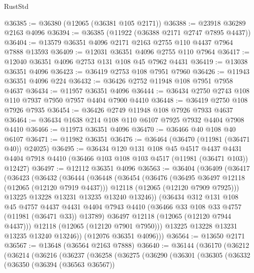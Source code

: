 \begin{lexlean}{RustStd}
\begin{coremodule}
@36385 := @36380 (@12065 (@36381 @105 @2171))
@36388 := @23918 @36289 @2163 @4096
@36394 := @36385 (@11922 (@36388 @2171 @2747 @7895 @4437))
@36404 := @13579 @36351 @4096 @2171 @2163 @2755 @110 @4437 @7964 @7888 @13593
@36409 := @12031 @36351 @4096 @2755 @110 @7964
@36417 := @12040 @36351 @4096 @2753 @131 @108 @45 @7962 @4431
@36419 := @13038 @36351 @4096
@36423 := @36419 @2753 @108 @7951 @7960
@36426 := @11943 @36351 @4096 @224
@36432 := @36426 @2752 @11948 @108 @7951 @7958 @4637
@36434 := @11957 @36351 @4096
@36444 := @36434 @2750 @2743 @108 @110 @7937 @7950 @7957 @4404 @7900 @4410
@36448 := @36419 @2750 @108 @7926 @7935
@36454 := @36426 @2749 @11948 @108 @7926 @7933 @4637
@36464 := @36434 @1638 @214 @108 @110 @6107 @7925 @7932 @4404 @7908 @4410
@36466 := @11973 @36351 @4096
@36470 := @36466 @40 @108 @40 @6107
@36471 := @11982 @36351
@36476 := @36464 (@36470 (@11981 (@36471 @40)) @24025)
@36495 := @36434
    @120
    @131
    @108
    @45
    @4517
    @4437
    @4431
    @4404
    @7918
    @4410
    (@36466 @103 @108 @103 @4517 (@11981 (@36471 @103)) @12427)
@36497 := @12112 @36351 @4096
@36563 := @36404
    (@36409
      (@36417
        (@36423
          (@36432
            (@36444
              (@36448
                (@36454
                  (@36476
                    (@36495 @36497 @12118 (@12065 (@12120 @7919 @4437)))
                    @12118
                    (@12065 (@12120 @7909 @7925)))
                  @13225
                  @13228
                  @13231
                  @13235
                  @13240
                  @13246))
              (@36434
                @312
                @131
                @108
                @45
                @4757
                @4437
                @4431
                @4404
                @7943
                @4410
                (@36466 @33 @108 @33 @4757 (@11981 (@36471 @33)) @13789)
                @36497
                @12118
                (@12065 (@12120 @7944 @4437)))
              @12118
              (@12065 (@12120 @7901 @7950)))
            @13225
            @13228
            @13231
            @13235
            @13240
            @13246))
        (@12076 @36351 @4096)))
@36564 := @13650 @2171
@36567 := @13648 (@36564 @2163 @7888)
@36640 := @36144
    (@36170
      (@36212
        (@36214
          (@36216
            (@36237
              (@36258
                (@36275
                  (@36290
                    (@36301
                      (@36305
                        (@36332
                          (@36350
                            (@36394 (@36563 @36567))

\end{coremodule}
\end{lexlean}
